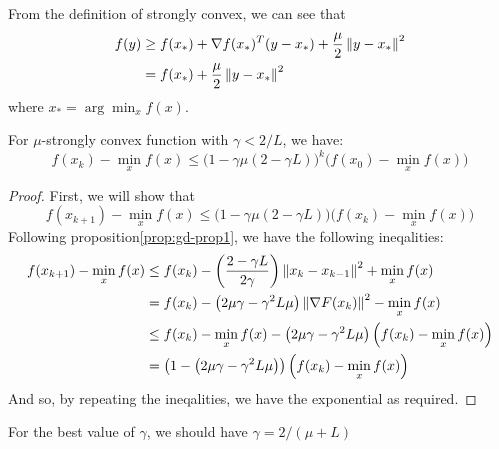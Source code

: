 \begin{remark}
    From the definition of strongly convex, we can see that
    \begin{equation*}
    \begin{aligned}
        f(y) &\ge f(x_*) + \nabla f(x_*)^T(y-x_*) + \frac{\mu}{2}\left\lVert y-x_*\right\rVert^2 \\
        &= f(x_*) + \frac{\mu}{2}\left\lVert y-x_*\right\rVert^2 \\ 
    \end{aligned}
    \end{equation*}
    where $x_* = \arg\min_x f(x)$. 
\end{remark}

\begin{theorem}
    For $\mu$-strongly convex function with $\gamma < 2/L$, we have:
    \begin{equation*}
        f(x_k) - \min_x f(x) \le \Big( 1-\gamma\mu (2-\gamma L) \Big)^k\Big( f(x_0) - \min_x f(x) \Big)
    \end{equation*}
\end{theorem}
\begin{proof}
    First, we will show that 
    \begin{equation*}
        f(x_{k+1}) - \min_x f(x) \le \Big( 1-\gamma\mu (2-\gamma L) \Big)\Big( f(x_k) - \min_x f(x) \Big) 
    \end{equation*}
    Following proposition\ref{prop:gd-prop1}, we have the following ineqalities:
    \begin{equation*}
    \begin{aligned}
        f(x_{k+1}) - \min_x f(x) &\le f(x_k) - \left( \frac{2-\gamma L}{2\gamma} \right)\left\lVert x_{k} - x_{k-1}\right\rVert^2 + \min_x f(x)\\
        &= f(x_k) - \left( 2\mu\gamma-\gamma^2 L\mu \right)\left\lVert\nabla F(x_k)\right\rVert^2- \min_x f(x) \\
        &\le f(x_k)- \min_x f(x) - \left( 2\mu\gamma-\gamma^2 L\mu \right)\Big( f(x_k) - \min_xf(x) \Big) \\
        &= \left( 1 - \left( 2\mu\gamma-\gamma^2 L\mu \right)  \right)\Big( f(x_k) - \min_xf(x) \Big)
    \end{aligned}
    \end{equation*}
    And so, by repeating the ineqalities, we have the exponential as required.
\end{proof}

\begin{remark}
    For the best value of $\gamma$, we should have $\gamma = 2/(\mu+L)$
\end{remark}


